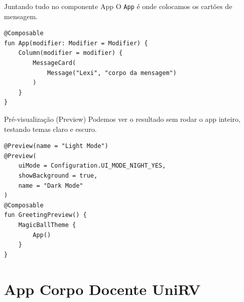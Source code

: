 \documentclass[aspectratio=169]{beamer}
\begin{document}
\begin{frame}[fragile]{Juntando tudo no componente App}
  O \texttt{App} é onde colocamos os cartões de mensagem.
  \begin{lstlisting}[style=KotlinStyle]
@Composable
fun App(modifier: Modifier = Modifier) {
    Column(modifier = modifier) {
        MessageCard(
            Message("Lexi", "corpo da mensagem")
        )
    }
}
  \end{lstlisting}
\end{frame}

\begin{frame}[fragile]{Pré-visualização (Preview)}
  Podemos ver o resultado sem rodar o app inteiro, testando temas claro e escuro.
  \begin{lstlisting}[style=KotlinStyle]
@Preview(name = "Light Mode")
@Preview(
    uiMode = Configuration.UI_MODE_NIGHT_YES,
    showBackground = true,
    name = "Dark Mode"
)
@Composable
fun GreetingPreview() {
    MagicBallTheme {
        App()
    }
}
  \end{lstlisting}
\end{frame}


\section{App Corpo Docente UniRV}
\end{document}
